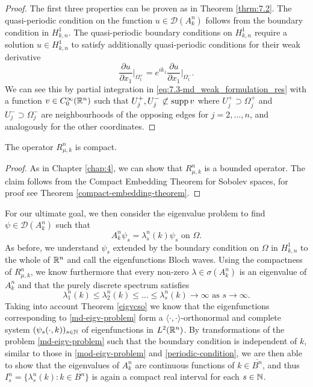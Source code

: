 \begin{proof}
 	The first three properties can be proven as in Theorem \ref{thrm:7.2}. The quasi-periodic condition on the function $u \in \mathcal{D}(A^{n}_{k})$ follows from the boundary condition in $H^{1}_{k, n}$. The quasi-periodic boundary conditions on $H^{1}_{k,n}$ require a solution $u \in H^{1}_{k, n}$ to satisfy additionally quasi-periodic conditions for their weak derivative
 		\[ \frac{\partial u}{\partial x_{1}}\big|_{\Omega_{1}^{+}} = e^{ik_{1}} \frac{\partial u}{\partial x_{1}}\big|_{\Omega_{1}^{-}}. \]
 		We can see this by partial integration in \eqref{eq:7.3-md_weak_formulation_res} with a function $v \in C_{0}^{\infty}(\mathbb{R}^{n})$ such that $U^{+}_{j}, U^{-}_{j} \not\subset \operatorname{supp} v$ where $U^{+}_{j} \supset \Omega_{j}^{+}$ and $U^{-}_{j} \supset \Omega_{j}^{-}$ are neighbourhoods of the opposing edges for $j = 2, \dotsc, n$, and analogously for the other coordinates.
\end{proof}

\begin{theorem}
	The operator $R_{\mu, k}^{n}$ is compact.	

	\begin{proof}
		As in Chapter \ref{chap:4}, we can show that $R_{\mu, k}^{n}$ is a bounded operator. The claim follows from the Compact Embedding Theorem for Sobolev spaces, for proof see Theorem \ref{compact-embedding-theorem}.
	\end{proof}
\end{theorem}

For our ultimate goal, we then consider the eigenvalue problem to find $\psi \in \mathcal{D}(A^{n}_{k})$ such that
	\begin{equation}
		A^{n}_{k} \psi_{s} = \lambda^{n}_{s}(k) \psi_{s} \text{ on } \Omega. \label{md-eigv-problem}
	\end{equation}
As before, we understand $\psi_{s}$ extended by the boundary condition on $\Omega$ in $H^{1}_{k, n}$ to the whole of $\mathbb{R}^{n}$ and call the eigenfunctions Bloch waves. Using the compactness of $R_{\mu, k}^{n}$, we know furthermore that every non-zero $\lambda \in \sigma(A_{k}^{n})$ is an eigenvalue of $A_{k}^{n}$ and that the purely discrete spectrum satisfies
	\begin{equation}
		\lambda^{n}_{1}(k) \leq \lambda^{n}_{2}(k) \leq \dotsc \leq \lambda^{n}_{s}(k) \rightarrow \infty \text{ as } s \rightarrow \infty. \label{md-comment-after}
	\end{equation}
Taking into account Theorem \ref{eigvcso} we know that the eigenfunctions corresponding to \eqref{md-eigv-problem} form a $\langle \cdot , \cdot \rangle$-orthonormal and complete system $(\psi_{s}(\cdot, k))_{s \in \mathbb{N}}$ of eigenfunctions in $L^{2}(\mathbb{R}^{n})$. By transformations of the problem \eqref{md-eigv-problem} such that the boundary condition is independent of $k$, similar to those in \eqref{mod-eigv-problem} and \eqref{periodic-condition}, we are then able to show that the eigenvalues of $A^{n}_{k}$ are continuous functions of $k \in \overline{B^{n}}$, and thus $I^{n}_{s} = \{ \lambda^{n}_{s}(k) : k \in \overline{B^{n}} \}$ is again a compact real interval for each $s \in \mathbb{N}$.
~\\

